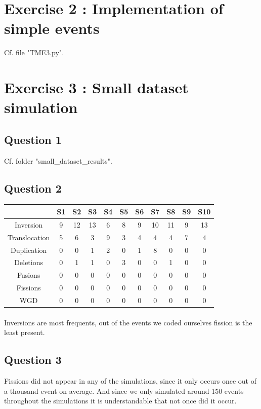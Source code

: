 \documentclass[]{article}
\theoremstyle{definition}
\begin{document}
\section{Exercise 2 : Implementation of simple events}
Cf. file "TME3.py".

\section{Exercise 3 : Small dataset simulation}
\subsection{Question 1}

Cf. folder "small\_dataset\_results".

\subsection{Question 2}
\begin{center}
\begin{tabular}{|*{11}{c|}}
	\hline
	& S1& S2  & S3  & S4 & S5
	& S6& S7 & S8 & S9 & S10 \\
	\hline
	Inversion     &9 &12&13&6 &8 &9 &10&11&9 &13 \\
	\hline
	Translocation &5 &6 &3 &9 &3 &4 &4 &4 &7 &4 \\
	\hline
	Duplication   &0 &0 &1 &2 &0 &1 &8 &0 &0 &0 \\
	\hline
	Deletions     &0 &1 &1 &0 &3 &0 &0 &1 &0 &0 \\
	\hline
	Fusions       &0 &0 &0 &0 &0 &0 &0 &0 &0 &0 \\
	\hline
	Fissions      &0 &0 &0 &0 &0 &0 &0 &0 &0 &0 \\
	\hline
	WGD           &0 &0 &0 &0 &0 &0 &0 &0 &0 &0 \\
	\hline
\end{tabular}
\end{center}
\paragraph*{}
Inversions are most frequents, out of the events we coded ourselves fission is the least present.

\subsection{Question 3}
Fissions did not appear in any of the simulations, since it only occurs once out of a thousand event on average. And since we only simulated around 150 events throughout the simulations it is understandable that not once did it occur.
\end{document}
